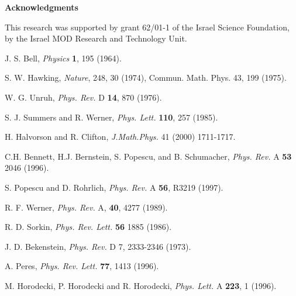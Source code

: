 \documentclass[12pt]{article}
\begin{document}
\vspace {2cm}

{\bf Acknowledgments\hskip 6pt}

This research was supported by grant 62/01-1 of
the Israel Science Foundation,
by the Israel MOD Research and Technology Unit.


\begin{thebibliography}{99}

 J. S. Bell,
{\it Physics} {\bf 1}, 195 (1964).

 S. W. Hawking,
{\it Nature}, 248, 30 (1974),
Commun. Math. Phys. 43, 199 (1975).

 W. G. Unruh,
{\it Phys. Rev.} D {\bf 14}, 870 (1976).

 S. J. Summers and R. Werner,
{\it Phys. Lett.} {\bf 110},
257 (1985).

 H. Halvorson and R. Clifton,
{\it J.Math.Phys.} 41 (2000) 1711-1717.


 C.H. Bennett, H.J. Bernstein, S. Popescu,
and B.  Schumacher,
 {\it Phys. Rev.} A {\bf 53} 2046 (1996).

S. Popescu and D. Rohrlich,
{\it Phys. Rev.} {A} {\bf 56},
R3219 (1997).


R. F. Werner,
{\it Phys. Rev.} A, {\bf 40}, 4277 (1989).

 R. D. Sorkin,
{\it Phys. Rev. Lett.} {\bf 56} 1885
(1986).

J. D. Bekenstein,
{\it Phys. Rev.} D 7, 2333-2346
(1973).


 A. Peres,
{\it Phys. Rev. Lett.} {\bf 77}, 1413 (1996).


 M. Horodecki, P. Horodecki and R. Horodecki,
{\it Phys. Lett.} A {\bf 223}, 1 (1996).



\end{thebibliography}
\end{document}
